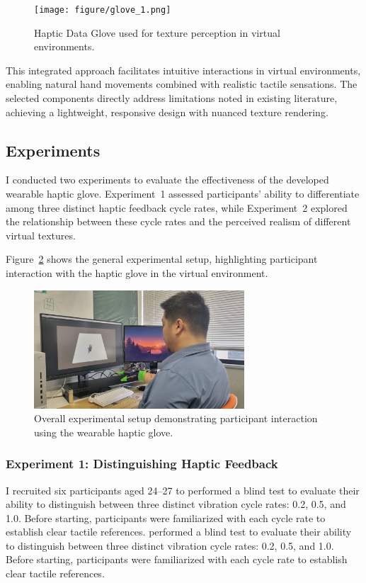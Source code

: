 \documentclass[graybox]{svmult}
\begin{document}
\begin{figure}
	\centering
	\texttt{[image: figure/glove\_1.png]}%
	\caption{Haptic Data Glove used for texture perception in virtual environments.}\label{fig:glove_1}
\end{figure}

This integrated approach facilitates intuitive interactions in virtual environments, enabling natural hand movements combined with realistic tactile sensations. The selected components directly address limitations noted in existing literature, achieving a lightweight, responsive design with nuanced texture rendering.

\subsection{Experiments}\label{sec:Experiments}
I conducted two experiments to evaluate the effectiveness of the developed wearable haptic glove. Experiment~1 assessed participants' ability to differentiate among three distinct haptic feedback cycle rates, while Experiment~2 explored the relationship between these cycle rates and the perceived realism of different virtual textures.

Figure~\ref{fig:experiment_setup} shows the general experimental setup, highlighting participant interaction with the haptic glove in the virtual environment.

\begin{figure}\centering
	\includegraphics[width=0.7\textwidth]{figure/experiment.png}%
	\caption{Overall experimental setup demonstrating participant interaction using the wearable haptic glove.}\label{fig:experiment_setup}
\end{figure}

\subsubsection{Experiment 1: Distinguishing Haptic Feedback}
I recruited six participants aged 24–27 to performed a blind test to evaluate their ability to distinguish between three distinct vibration cycle rates: 0.2, 0.5, and 1.0. Before starting, participants were familiarized with each cycle rate to establish clear tactile references.
performed a blind test to evaluate their ability to distinguish between three distinct vibration cycle rates: 0.2, 0.5, and 1.0. Before starting, participants were familiarized with each cycle rate to establish clear tactile references.
\end{document}
